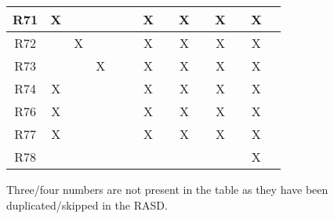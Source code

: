 \begin{table}[H]
\begin{tabular}{|c|c|c|c|c|c|c|c|c|c|c|c|c|c|}
\hline
{\cellcolor[rgb]{0.71,0.102,0}}R71 & X  &    &    &    &    & X  &    & X  &    & X   &      & X   &      \\ 
\hline
{\cellcolor[rgb]{0.71,0.102,0}}R72 &    & X  &    &    &    & X  &    & X  &    & X   &      & X   &      \\ 
\hline
{\cellcolor[rgb]{0.71,0.102,0}}R73 &    &    & X  &    &    & X  &    & X  &    & X   &      & X   &      \\ 
\hline
{\cellcolor[rgb]{0.71,0.102,0}}R74 & X  &    &    &    &    & X  &    & X  &    & X   &      & X   &      \\ 
\hline
{\cellcolor[rgb]{0.71,0.102,0}}R76 & X  &    &    &    &    & X  &    & X  &    & X   &      & X   &      \\ 
\hline
{\cellcolor[rgb]{0.71,0.102,0}}R77 & X  &    &    &    &    & X  &    & X  &    & X   &      & X   &      \\ 
\hline
{\cellcolor[rgb]{0.71,0.102,0}}R78 &    &    &    &    &    &    &    &    &    &     &      & X   &      \\
\hline
\end{tabular}
\end{table}
{\small Three/four numbers are not present in the table as they have been duplicated/skipped in the RASD.}